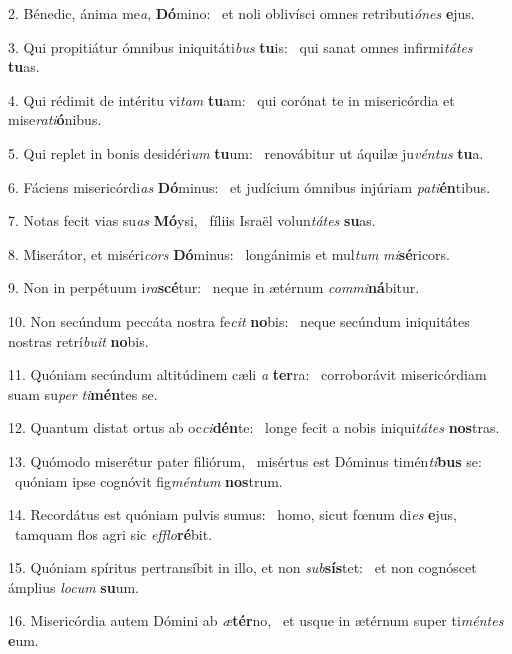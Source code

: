 2. Bénedic, ánima me\textit{a}, \textbf{Dó}mino: \ast\  et noli oblivísci omnes retributi\textit{ó}\textit{nes} \textbf{e}jus.\

3. Qui propitiátur ómnibus iniquitáti\textit{bus} \textbf{tu}is: \ast\  qui sanat omnes infirmi\textit{tá}\textit{tes} \textbf{tu}as.\

4. Qui rédimit de intéritu vi\textit{tam} \textbf{tu}am: \ast\  qui corónat te in misericórdia et mise\textit{ra}\textit{ti}\textbf{ó}nibus.\

5. Qui replet in bonis desidéri\textit{um} \textbf{tu}um: \ast\  renovábitur ut áquilæ ju\textit{vén}\textit{tus} \textbf{tu}a.\

6. Fáciens misericórdi\textit{as} \textbf{Dó}minus: \ast\  et judícium ómnibus injúriam \textit{pa}\textit{ti}\textbf{én}tibus.\

7. Notas fecit vias su\textit{as} \textbf{Mó}ysi, \ast\  fíliis Israël volun\textit{tá}\textit{tes} \textbf{su}as.\

8. Miserátor, et miséri\textit{cors} \textbf{Dó}minus: \ast\  longánimis et mul\textit{tum} \textit{mi}\textbf{sé}ricors.\

9. Non in perpétuum i\textit{ra}\textbf{scé}tur: \ast\  neque in ætérnum \textit{com}\textit{mi}\textbf{ná}bitur.\

10. Non secúndum peccáta nostra fe\textit{cit} \textbf{no}bis: \ast\  neque secúndum iniquitátes nostras retrí\textit{bu}\textit{it} \textbf{no}bis.\

11. Quóniam secúndum altitúdinem cæli \textit{a} \textbf{ter}ra: \ast\  corroborávit misericórdiam suam su\textit{per} \textit{ti}\textbf{mén}tes se.\

12. Quantum distat ortus ab oc\textit{ci}\textbf{dén}te: \ast\  longe fecit a nobis iniqui\textit{tá}\textit{tes} \textbf{nos}tras.\

13. Quómodo miserétur pater filiórum, \dag\  misértus est Dóminus timén\textit{ti}\textbf{bus} se: \ast\  quóniam ipse cognóvit fig\textit{mén}\textit{tum} \textbf{nos}trum.\

14. Recordátus est quóniam pulvis sumus: \dag\  homo, sicut fœnum di\textit{es} \textbf{e}jus, \ast\  tamquam flos agri sic \textit{ef}\textit{flo}\textbf{ré}bit.\

15. Quóniam spíritus pertransíbit in illo, et non \textit{sub}\textbf{sís}tet: \ast\  et non cognóscet ámplius \textit{lo}\textit{cum} \textbf{su}um.\

16. Misericórdia autem Dómini ab \textit{æ}\textbf{tér}no, \ast\  et usque in ætérnum super ti\textit{mén}\textit{tes} \textbf{e}um.\

